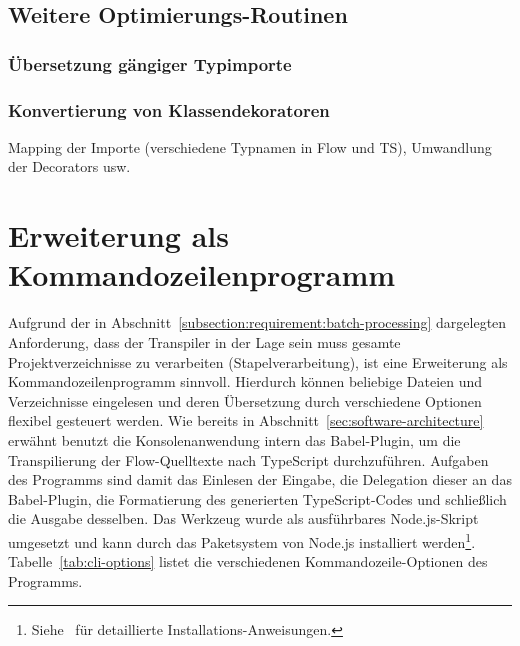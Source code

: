 \subsection{Weitere Optimierungs-Routinen}
  \subsubsection{Übersetzung gängiger Typimporte}
  \subsubsection{Konvertierung von Klassendekoratoren}
  \label{subsec:class-decorators}

Mapping der Importe (verschiedene Typnamen in Flow und TS), Umwandlung der Decorators usw.

\section{Erweiterung als Kommandozeilenprogramm}

Aufgrund der in Abschnitt~\ref{subsection:requirement:batch-processing} dargelegten Anforderung, dass der Transpiler in der Lage sein muss gesamte Projektverzeichnisse zu verarbeiten (Stapelverarbeitung), ist eine Erweiterung als Kommandozeilenprogramm sinnvoll. Hierdurch können beliebige Dateien und Verzeichnisse eingelesen und deren Übersetzung durch verschiedene Optionen flexibel gesteuert werden. Wie bereits in Abschnitt~\ref{sec:software-architecture} erwähnt benutzt die Konsolenanwendung intern das Babel-Plugin, um die Transpilierung der Flow-Quelltexte nach TypeScript durchzuführen. Aufgaben des Programms sind damit das Einlesen der Eingabe, die Delegation dieser an das Babel-Plugin, die Formatierung des generierten TypeScript-Codes und schließlich die Ausgabe desselben.
Das Werkzeug wurde als ausführbares Node.js-Skript umgesetzt und kann durch das Paketsystem von Node.js installiert werden\footnote{Siehe~\autocite{REFLOW_GITHUB} für detaillierte Installations-Anweisungen.}. Tabelle~\ref{tab:cli-options} listet die verschiedenen Kommandozeile-Optionen des Programms.

